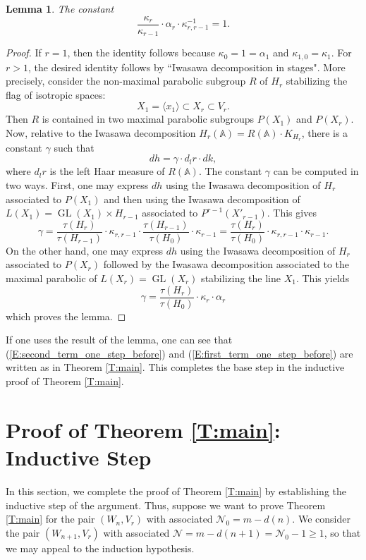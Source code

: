 \documentclass[10pt]{amsart}
\theoremstyle{plain}
\newtheorem{Lem}[equation]{Lemma}
\numberwithin{equation}{section}
\begin{document}
\begin{Lem} \label{L:kappa3}
The constant
\[  \frac{\kappa_r}{\kappa_{r-1}} \cdot \alpha_r  \cdot \kappa_{r, r-1}^{-1}  = 1. \]
\end{Lem}
\begin{proof}
If $r=1$, then the identity follows because $\kappa_0 = 1 = \alpha_1$ and $\kappa_{1,0} = \kappa_1$. 
For $r >1$, the desired identity  follows by ``Iwasawa decomposition in stages". More precisely,
consider the non-maximal parabolic subgroup $R$ of $H_r$ stabilizing
the flag of isotropic spaces:
\[   X_1 = \langle x_1 \rangle  \subset X_r  \subset V_r.  \]
Then $R$ is contained in two maximal parabolic subgroups $P(X_1)$ and $P(X_r)$.
Now, relative to the Iwasawa decomposition $H_r({\mathbb{A}}) = R({\mathbb{A}}) \cdot K_{H_r}$,  
there is a constant $\gamma$ such that  
  \[  dh  = \gamma \cdot d_l r \cdot dk,  \]
  where $d_lr$ is the left Haar measure of $R({\mathbb{A}})$.
 The constant $\gamma$ can be computed in two ways. First, one may
 express $dh$ using the Iwasawa decomposition of $H_r$ associated to
 $P(X_1)$ and then using the  Iwasawa decomposition  of $L(X_1) =
 {\operatorname{GL}}(X_1) \times H_{r-1}$ associated to $P^{r-1}({X'}_{r-1})$. This
 gives
 \[  \gamma =  \frac{\tau(H_r)}{\tau(H_{r-1})} \cdot \kappa_{r, r-1} \cdot \frac{\tau(H_{r-1})}{\tau(H_0)} \cdot \kappa_{r-1}  = \frac{\tau(H_r)}{\tau(H_0)} \cdot \kappa_{r,r-1} \cdot \kappa_{r-1}.  \]
 On the other hand, one may express $dh$ using the Iwasawa
 decomposition of $H_r$ associated to $P(X_r)$ followed by the Iwasawa
 decomposition associated to the maximal parabolic of $L(X_r) =
 {\operatorname{GL}}(X_r)$ stabilizing the line $X_1$. This yields
 \[  \gamma =\frac{\tau(H_r)}{\tau(H_0)} \cdot  \kappa_r \cdot \alpha_r \]
which proves the lemma.
 \end{proof}
\vskip 5pt

If one uses the result of the lemma, one can see that
(\ref{E:second_term_one_step_before}) and
(\ref{E:first_term_one_step_before}) are written as in Theorem
\ref{T:main}. This completes the base step in the inductive
proof of Theorem \ref{T:main}. 

  \vskip 15pt
  
 \section{\bf Proof of Theorem \ref{T:main}: Inductive Step}
 In this section, we complete the proof of Theorem \ref{T:main} by
 establishing the inductive step of the argument.  Thus, suppose we
 want to prove Theorem \ref{T:main} for the pair $(W_n, V_r)$ with
 associated 
 $\mathcal{N}_0 = m - d(n)$. We consider the pair $(W_{n+1}, V_r)$
 with associated $\mathcal{N} = m - d(n+1) = \mathcal{N}_0 -1 \geq 1$, so
 that we may appeal to the induction hypothesis.
 \vskip 5pt
 
\end{document}
